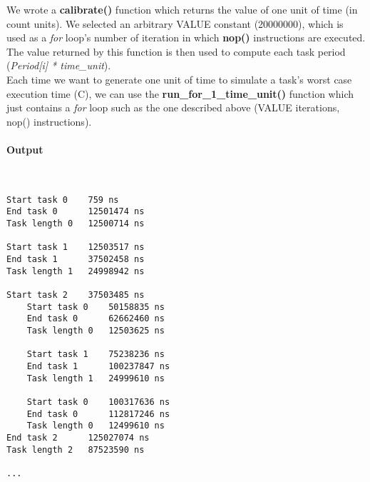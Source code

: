 We wrote a \textbf{calibrate()} function which returns the value of one unit of time (in count units). We selected an arbitrary VALUE constant (20000000), which is used as a \emph{for} loop's number of iteration in which \textbf{nop()} instructions are executed. The value returned by this function is then used to compute each task period (\emph{Period[i] * time\_unit}).\\

Each time we want to generate one unit of time to simulate a task's worst case execution time (C), we can use the \textbf{run\_for\_1\_time\_unit()} function which just contains a \emph{for} loop such as the one described above (VALUE iterations, nop() instructions).

\paragraph{Output}
\

\begin{lstlisting}[keywordstyle=\color{black}, caption={Output (reformatted) RM 1\textsuperscript{st} set}]
Start task 0	759 ns
End task 0		12501474 ns
Task length 0	12500714 ns

Start task 1	12503517 ns
End task 1		37502458 ns
Task length 1	24998942 ns

Start task 2	37503485 ns
	Start task 0	50158835 ns
	End task 0		62662460 ns
	Task length 0	12503625 ns

	Start task 1	75238236 ns
	End task 1		100237847 ns
	Task length 1	24999610 ns

	Start task 0	100317636 ns
	End task 0		112817246 ns
	Task length 0	12499610 ns
End task 2		125027074 ns
Task length 2	87523590 ns

...
\end{lstlisting}


